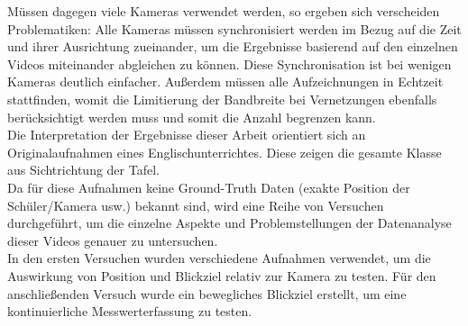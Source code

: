 Müssen dagegen viele Kameras verwendet werden, so ergeben sich verscheiden Problematiken: Alle Kameras müssen synchronisiert werden im Bezug auf die Zeit und ihrer Ausrichtung zueinander, um die Ergebnisse basierend auf den einzelnen Videos miteinander abgleichen zu können. Diese Synchronisation ist bei wenigen Kameras deutlich einfacher. Außerdem müssen alle Aufzeichnungen in Echtzeit stattfinden, womit die Limitierung der Bandbreite bei Vernetzungen ebenfalls berücksichtigt werden muss und somit die Anzahl begrenzen kann.\\
Die Interpretation der Ergebnisse dieser Arbeit orientiert sich an Originalaufnahmen eines Englischunterrichtes. Diese zeigen die gesamte Klasse aus Sichtrichtung der Tafel.\\
Da für diese Aufnahmen keine Ground-Truth Daten (exakte Position der Schüler/Kamera usw.) bekannt sind, wird eine Reihe von Versuchen durchgeführt, um die einzelne Aspekte und Problemstellungen der Datenanalyse dieser Videos genauer zu untersuchen.\\
In den ersten Versuchen wurden verschiedene Aufnahmen verwendet, um die Auswirkung von Position und Blickziel relativ zur Kamera zu testen. Für den anschließenden Versuch wurde ein bewegliches Blickziel erstellt, um eine kontinuierliche Messwerterfassung zu testen.